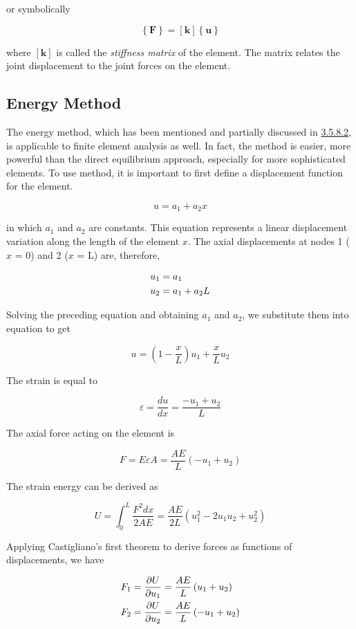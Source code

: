 \documentclass[a4paper,openany,12pt]{book}
\begin{document}
{{or symbolically

$$\left\{ \mathbf{F} \right\} = \left[ \mathbf{k} \right]\left\{ \mathbf{u} \right\}$$

where \([\mathbf{k}]\) is called the \emph{stiffness matrix} of the element.
The matrix relates the joint displacement to the joint forces on the
element.

\subsection{Energy Method}
\label{energy-method}
The energy method, which has been mentioned and partially discussed in
\hyperref[subsub: energy method]{3.5.8.2}, is applicable to finite element
analysis as well. In fact, the method is easier, more powerful than the
direct equilibrium approach, especially for more sophisticated elements.
To use method, it is important to first define a displacement function
for the element.

$$u = a_1 + a_2x$$

in which \(a_1\) and \(a_2\) are constants. This equation represents a
linear displacement variation along the length of the element \(x\). The
axial displacements at nodes 1 (\(x\) = 0) and 2 (\(x\) = L) are, therefore,

$$\begin{gathered}
  u_1 = a_1 \hfill \\
  u_2 = a_1 + a_2L \hfill \\ 
\end{gathered}$$

Solving the preceding equation and obtaining \(a_1\) and \(a_2\), we
substitute them into equation to get

$$u = \left( 1 - \frac{x}{L} \right)u_1 + \frac{x}{L}u_2$$

The strain is equal to

$$\varepsilon  = \frac{du}{dx} = \frac{-u_1 + u_2}{L}$$

The axial force acting on the element is

$$F = E\varepsilon A = \frac{{AE}}{L}( - {u_1} + {u_2})$$

The strain energy can be derived as

$$U = \int_0^L \frac{F^2dx}{2AE} = \frac{AE}{2L}\left( u_1^2 - 2u_1u_2 + u_2^2 \right)$$

Applying Castigliano's first theorem to derive forces as functions of
displacements, we have

\begin{gather}
\label{eqn: stiffness matrix energy}
  F_1 = \frac{\partial U}{\partial u_1} = \frac{AE}{L}\left( u_1 + u_2 \right) \hfill \\
  F_2 = \frac{\partial U}{\partial u_2} = \frac{AE}{L}\left( -u_1 + u_2 \right) \hfill \\ 
\end{gather}

}}
\end{document}
